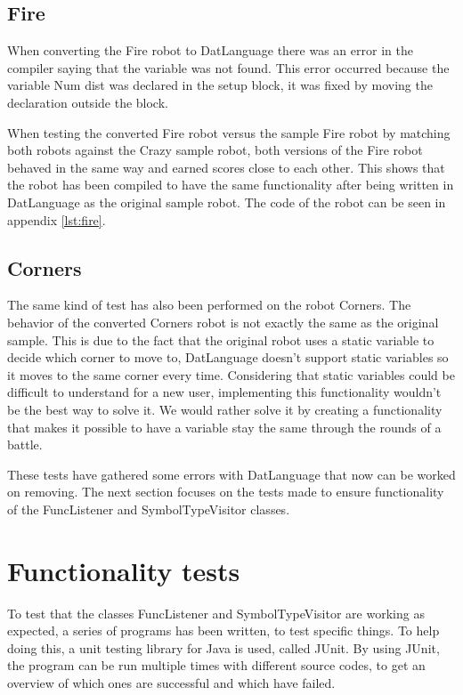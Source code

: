 \subsection{Fire}
When converting the Fire robot to DatLanguage there was an error in the compiler saying that the variable was not found. This error occurred because the variable Num dist was declared in the setup block, it was fixed by moving the declaration outside the block.

When testing the converted Fire robot versus the sample Fire robot by matching both robots against the Crazy sample robot, both versions of the Fire robot behaved in the same way and earned scores close to each other.
This shows that the robot has been compiled to have the same functionality after being written in DatLanguage as the original sample robot.
The code of the robot can be seen in appendix \ref{lst:fire}.

\subsection{Corners}
The same kind of test has also been performed on the robot Corners. The behavior of the converted Corners robot is not exactly the same as the original sample. This is due to the fact that the original robot uses a static variable to decide which corner to move to, DatLanguage doesn't support static variables so it moves to the same corner every time. 
Considering that static variables could be difficult to understand for a new user, implementing this functionality wouldn't be the best way to solve it. We would rather solve it by creating a functionality that makes it possible to have a variable stay the same through the rounds of a battle. 

These tests have gathered some errors with DatLanguage that now can be worked on removing. The next section focuses on the tests made to ensure functionality of the FuncListener and SymbolTypeVisitor classes.

\section{Functionality tests}
To test that the classes FuncListener and SymbolTypeVisitor are working as expected, a series of programs has been written, to test specific things. To help doing this, a unit testing library for Java is used, called JUnit. By using JUnit, the program can be run multiple times with different source codes, to get an overview of which ones are successful and which have failed.

